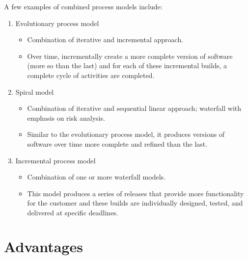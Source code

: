 	A few examples of combined process models include:
	\begin{enumerate}
		\item Evolutionary process model
			\begin{itemize}
				\item Combination of iterative and incremental approach.
				\item Over time, incrementally create a more complete version of software (more so than the last) and for each of these incremental builds, a complete cycle of activities are completed.
			\end{itemize}
		\item Spiral model
			\begin{itemize}
				\item Combination of iterative and sequential linear approach; waterfall with emphasis on risk analysis.
				\item Similar to the evolutionary process model, it produces versions of software over time more complete and refined than the last.
			\end{itemize}
		\item Incremental process model
			\begin{itemize}
				\item Combination of one or more waterfall models.
				\item This model produces a series of releases that provide more functionality for the customer and these builds are individually designed, tested, and delivered at specific deadlines.
			\end{itemize}
	\end{enumerate}


	\part{Advantages}




